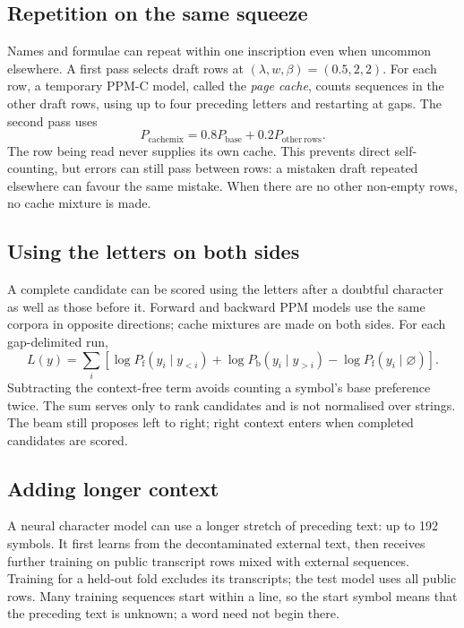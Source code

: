 \documentclass[11pt]{article}
\begin{document}
\subsection{Repetition on the same squeeze}
Names and formulae can repeat within one inscription even when uncommon elsewhere. A first pass selects
draft rows at $(\lambda,w,\beta)=(0.5,2,2)$. For each row, a temporary PPM-C model, called the \emph{page
cache}, counts sequences in the other draft rows, using up to four preceding letters and restarting at
gaps. The second pass uses
\begin{equation}
 P_{\mathrm{cachemix}}=0.8P_{\mathrm{base}}+0.2P_{\mathrm{other\ rows}}.
 \label{eq:cache}
\end{equation}
The row being read never supplies its own cache. This prevents direct self-counting, but errors can still
pass between rows: a mistaken draft repeated elsewhere can favour the same mistake. When there are no
other non-empty rows, no cache mixture is made.

\subsection{Using the letters on both sides}
A complete candidate can be scored using the letters after a doubtful character as well as those before
it. Forward and backward PPM models use the same corpora in opposite directions; cache mixtures are made
on both sides. For each gap-delimited run,
\begin{equation}
 L(y)=\sum_i\left[\log P_{\mathrm f}(y_i\mid y_{<i})+
                       \log P_{\mathrm b}(y_i\mid y_{>i})-
                       \log P_{\mathrm f}(y_i\mid\varnothing)\right].
 \label{eq:twosided}
\end{equation}
Subtracting the context-free term avoids counting a symbol's base preference twice. The sum serves only
to rank candidates and is not normalised over strings. The beam still proposes left to right; right
context enters when completed candidates are scored.

\subsection{Adding longer context}
A neural character model can use a longer stretch of preceding text: up to 192 symbols.
It first learns from the decontaminated external text, then receives further training on public transcript
rows mixed with external sequences. Training for a held-out fold excludes its transcripts; the test model
uses all public rows. Many training sequences start within a line, so the start symbol means that the
preceding text is unknown; a word need not begin there.
\end{document}
